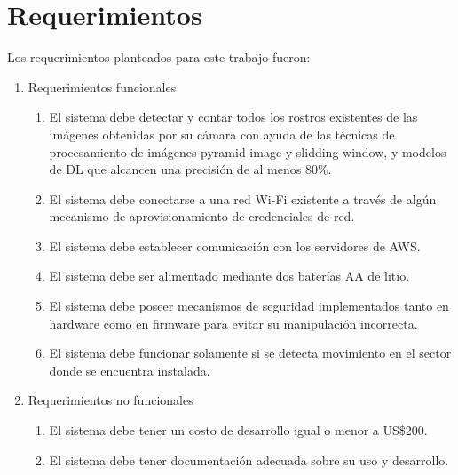 \section{Requerimientos}
Los requerimientos planteados para este trabajo fueron:
\begin{enumerate}
	\item Requerimientos funcionales
  \begin{enumerate}
     	\item El sistema debe detectar y contar todos los rostros existentes de las imágenes obtenidas por su cámara con ayuda de las técnicas de procesamiento de imágenes pyramid image y slidding window, y modelos de DL que alcancen una precisión de al menos 80\%.
		\item El sistema debe conectarse a una red Wi-Fi existente a través de algún mecanismo de aprovisionamiento de credenciales de red.
		\item El sistema debe establecer comunicación con los servidores de AWS.
		\item El sistema debe ser alimentado mediante dos baterías AA de litio.
		\item El sistema debe poseer mecanismos de seguridad implementados tanto en hardware como en firmware para evitar su manipulación incorrecta.
		\item El sistema debe funcionar solamente si se detecta movimiento en el sector donde se encuentra instalada.
	\end{enumerate}
	\item Requerimientos no funcionales
	\begin{enumerate}
		\item El sistema debe tener un costo de desarrollo igual o menor a US\$200.
		\item El sistema debe tener documentación adecuada sobre su uso y desarrollo.
	\end{enumerate}
\end{enumerate}







